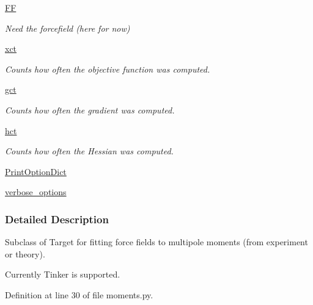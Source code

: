 \begin{DoxyCompactItemize}
\hyperlink{classforcebalance_1_1target_1_1Target_a38a37919783141ea37fdcf8b00ce0aaf}{F\-F}
\begin{DoxyCompactList}\small\item\em Need the forcefield (here for now) \end{DoxyCompactList}\item 
\hyperlink{classforcebalance_1_1target_1_1Target_aad2e385cfbf7b4a68f1c2cb41133fe82}{xct}
\begin{DoxyCompactList}\small\item\em Counts how often the objective function was computed. \end{DoxyCompactList}\item 
\hyperlink{classforcebalance_1_1target_1_1Target_aa625ac88c6744eb14ef281d9496d0dbb}{gct}
\begin{DoxyCompactList}\small\item\em Counts how often the gradient was computed. \end{DoxyCompactList}\item 
\hyperlink{classforcebalance_1_1target_1_1Target_a5b5a42f78052b47f29ed4b940c6111a1}{hct}
\begin{DoxyCompactList}\small\item\em Counts how often the Hessian was computed. \end{DoxyCompactList}\item 
\hyperlink{classforcebalance_1_1BaseClass_afc6659278497d7245bc492ecf405ccae}{Print\-Option\-Dict}
\item 
\hyperlink{classforcebalance_1_1BaseClass_afd68efa29ccd2f320f4cf82198214aac}{verbose\-\_\-options}
\end{DoxyCompactItemize}


\subsubsection{Detailed Description}
Subclass of Target for fitting force fields to multipole moments (from experiment or theory). 

Currently Tinker is supported. 

Definition at line 30 of file moments.\-py.



